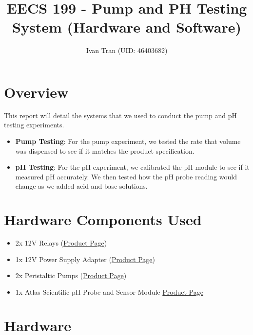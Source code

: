 \documentclass{article}
\title{EECS 199 - Pump and PH Testing System (Hardware and Software)}
\author{Ivan Tran (UID: 46403682)}
\begin{document}
    \maketitle

    \tableofcontents
    \newpage
    \section{Overview}
        \begin{flushleft}
            This report will detail the systems that we used to conduct the pump and pH testing experiments.
            \begin{itemize}
                \item \textbf{Pump Testing}: For the pump experiment, we tested the rate that volume was dispensed to see if it matches the product specification.
                \item \textbf{pH Testing}: For the pH experiment, we calibrated the pH module to see if it measured pH accurately. We then tested how the pH probe reading would change as we added acid and base solutions.
            \end{itemize}
        \end{flushleft}

    \section{Hardware Components Used}
    \begin{flushleft}
        \begin{itemize}
            \item 2x 12V Relays (\href{https://www.amazon.com/dp/B00LW15D1M/}{Product Page})
            \item 1x 12V Power Supply Adapter (\href{https://www.amazon.com/dp/B01GEA8PQA/}{Product Page})
            \item 2x Peristaltic Pumps (\href{https://www.amazon.com/dp/B07GWJ78FN/}{Product Page})
            \item 1x Atlas Scientific pH Probe and Sensor Module \href{https://www.amazon.com/dp/B00798612C/}{Product Page}
        \end{itemize}
    \end{flushleft}

    \section{Hardware}
\end{document}
